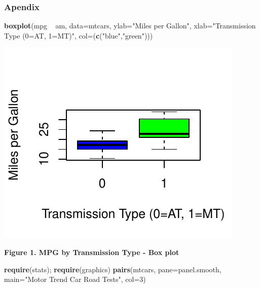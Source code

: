 \documentclass[]{article}
\newenvironment{Shaded}{\begin{snugshade}}{\end{snugshade}}
\newcommand{\KeywordTok}[1]{\textcolor[rgb]{0.13,0.29,0.53}{\textbf{{#1}}}}
\newcommand{\DataTypeTok}[1]{\textcolor[rgb]{0.13,0.29,0.53}{{#1}}}
\newcommand{\DecValTok}[1]{\textcolor[rgb]{0.00,0.00,0.81}{{#1}}}
\newcommand{\StringTok}[1]{\textcolor[rgb]{0.31,0.60,0.02}{{#1}}}
\newcommand{\NormalTok}[1]{{#1}}
\begin{document}
\subsubsection{Apendix}\label{apendix}

\begin{Shaded}
\begin{Highlighting}[]
\KeywordTok{boxplot}\NormalTok{(mpg ~}\StringTok{ }\NormalTok{am, }\DataTypeTok{data=}\NormalTok{mtcars, }\DataTypeTok{ylab=}\StringTok{"Miles per Gallon"}\NormalTok{, }\DataTypeTok{xlab=}\StringTok{"Transmission Type (0=AT, 1=MT)"}\NormalTok{, }\DataTypeTok{col=}\NormalTok{(}\KeywordTok{c}\NormalTok{(}\StringTok{"blue"}\NormalTok{,}\StringTok{"green"}\NormalTok{)))}
\end{Highlighting}
\end{Shaded}

\includegraphics{./Regression_Models_-_Course_Project_5_pages_files/figure-latex/smallplot.pdf}

\textbf{Figure 1. MPG by Transmission Type - Box plot}

\begin{Shaded}
\begin{Highlighting}[]
\KeywordTok{require}\NormalTok{(stats); }\KeywordTok{require}\NormalTok{(graphics)}
\KeywordTok{pairs}\NormalTok{(mtcars, }\DataTypeTok{pane=}\NormalTok{panel.smooth, }\DataTypeTok{main=}\StringTok{"Motor Trend Car Road Tests"}\NormalTok{, }\DataTypeTok{col=}\DecValTok{3}\NormalTok{)}
\end{Highlighting}
\end{Shaded}
\end{document}
